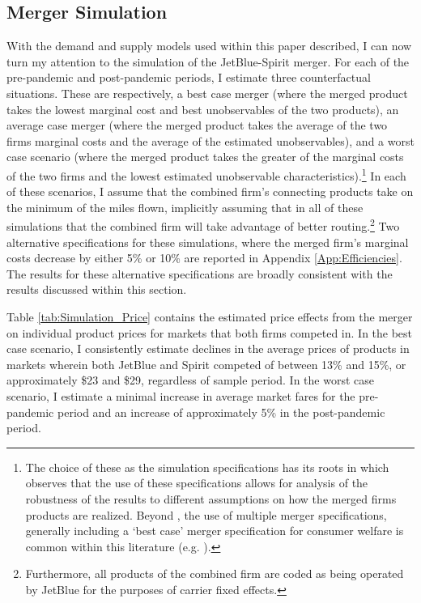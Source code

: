 \documentclass{article}
\begin{document}
	\subsection{Merger Simulation}
	\label{sec:Analysis_Merger}
	With the demand and supply models used within this paper described, I can now turn my attention to the simulation of the JetBlue-Spirit merger. For each of the pre-pandemic and post-pandemic periods, I estimate three counterfactual situations. These are respectively, a best case merger (where the merged product takes the lowest marginal cost and best unobservables of the two products), an average case merger (where the merged product takes the average of the two firms marginal costs and the average of the estimated unobservables), and a worst case scenario (where the merged product takes the greater of the marginal costs of the two firms and the lowest estimated unobservable characteristics).\footnote{The choice of these as the simulation specifications has its roots in \citet{ciliberto_market_2021} which observes that the use of these specifications allows for analysis of the robustness of the results to different assumptions on how the merged firms products are realized. Beyond \citet{ciliberto_market_2021}, the use of multiple merger specifications, generally including a `best case' merger specification for consumer welfare is common within this literature (e.g. \citet{li_repositioning_2022}).} In each of these scenarios, I assume that the combined firm's connecting products take on the minimum of the miles flown, implicitly assuming that in all of these simulations that the combined firm will take advantage of better routing.\footnote{Furthermore, all products of the combined firm are coded as being operated by JetBlue for the purposes of carrier fixed effects.} Two alternative specifications for these simulations, where the merged firm's marginal costs decrease by either 5\% or 10\% are reported in Appendix \ref{App:Efficiencies}. The results for these alternative specifications are broadly consistent with the results discussed within this section.

     
	 Table \ref{tab:Simulation_Price} contains the estimated price effects from the merger on individual product prices for markets that both firms competed in. In the best case scenario, I consistently estimate declines in the average prices of products in markets wherein both JetBlue and Spirit competed of between 13\% and 15\%, or approximately \$23 and \$29, regardless of sample period. In the worst case scenario, I estimate a minimal increase in average market fares for the pre-pandemic period and an increase of approximately 5\% in the post-pandemic period. 
     
\end{document}
